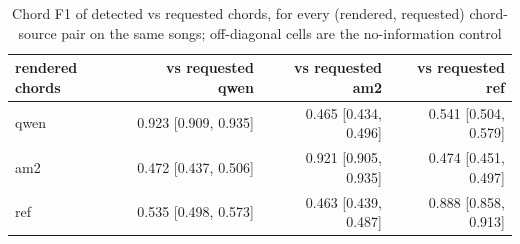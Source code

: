 \begin{table}[t]
\centering
\small
\begin{tabular}{lrrr}
\toprule
rendered chords & vs requested qwen & vs requested am2 & vs requested ref \\
\midrule
qwen & 0.923 [0.909, 0.935] & 0.465 [0.434, 0.496] & 0.541 [0.504, 0.579] \\
am2 & 0.472 [0.437, 0.506] & 0.921 [0.905, 0.935] & 0.474 [0.451, 0.497] \\
ref & 0.535 [0.498, 0.573] & 0.463 [0.439, 0.487] & 0.888 [0.858, 0.913] \\
\bottomrule
\end{tabular}
\caption{Chord F1 of detected vs requested chords, for every (rendered, requested) chord-source pair on the same songs; off-diagonal cells are the no-information control}
\label{tab:backing_chord_f1_matrix}
\end{table}
